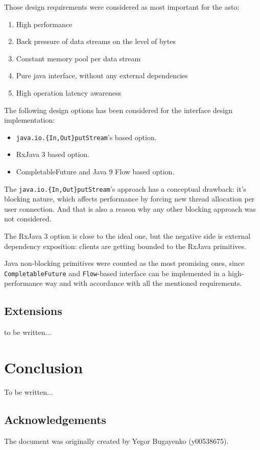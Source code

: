 \documentclass[12pt,oneside]{article}
\newcommand\dd[1]{\colorbox{gray!30}{\texttt{#1}}}
\begin{document}
Those design requirements were considered as most important for the asto: 
\begin{enumerate}
  \item High performance
  \item Back pressure of data streams on the level of bytes
	\item Constant memory pool per data stream
	\item Pure java interface, without any external dependencies
	\item High operation latency awareness
\end{enumerate}

The following design options has been considered for the interface design implementation:
\begin{itemize}
  \item \dd{java.io.\{In,Out\}putStream}'s based option. 
  \item RxJava 3 based option.
	\item CompletableFuture and Java 9 Flow based option.
\end{itemize}

The \dd{java.io.\{In,Out\}putStream}'s approach has a conceptual drawback: it's blocking nature,
which affects performance by forcing new thread allocation per user connection. And that is
also a reason why any other blocking approach was not considered.

The RxJava 3 option is close to the ideal one, but the negative side is external
dependency exposition: clients are getting bounded to the RxJava primitives. 

Java non-blocking primitives were counted as the most promising
ones, since \dd{CompletableFuture} and \dd{Flow}-based interface can be implemented in a 
high-performance way and with accordance with all the mentioned requirements.

\subsection{Extensions}
to be written...

\section{Conclusion}
\label{sec:conclusion}

To be written...

\subsection{Acknowledgements}
\label{sec:ack}

The document was originally created by Yegor Bugayenko (y00538675).

\printbibliography%
\end{document}
